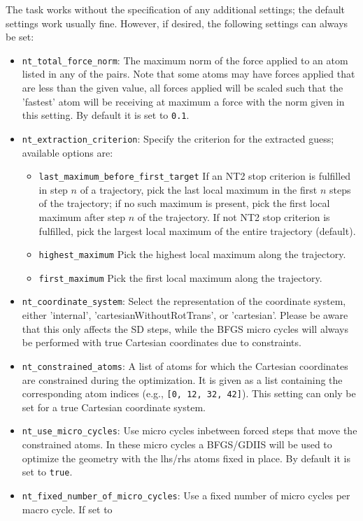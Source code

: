 \documentclass[]{tufte-book}
\begin{document}
The task works without the specification of any additional settings; the default settings work usually fine. However,
if desired, the following settings can always be set:
\begin{itemize}
\item \texttt{nt\_total\_force\_norm}: The maximum norm of the force applied to an atom listed in any of the pairs.
 Note that some atoms may have forces applied that are less than the given value, all forces applied will be scaled
 such that the 'fastest' atom will be receiving at maximum a force with the norm given in this setting.
 By default it is set to \texttt{0.1}.
\item \texttt{nt\_extraction\_criterion}: Specify the criterion for the extracted guess; available options are:
\begin{itemize}
  \item \texttt{last\_maximum\_before\_first\_target} If an NT2 stop criterion is fulfilled in step $n$ of a trajectory, pick the last local maximum in the first $n$ steps of the trajectory; if no such maximum is present, pick the first local maximum after step $n$ of the trajectory. If not NT2 stop criterion is fulfilled, pick the largest local maximum of the entire trajectory (default).
  \item \texttt{highest\_maximum} Pick the highest local maximum along the trajectory.
  \item \texttt{first\_maximum} Pick the first local maximum along the trajectory.
\end{itemize}
\item \texttt{nt\_coordinate\_system}: Select the representation of the coordinate system, either
 'internal'\cite{libirc}, 'cartesianWithoutRotTrans', or 'cartesian'.
Please be aware that this only affects the SD steps, while the BFGS micro cycles will always be performed with true
 Cartesian coordinates due to constraints.
\item \texttt{nt\_constrained\_atoms}: A list of atoms for which the Cartesian coordinates are constrained during the optimization.
  It is given as a list containing the corresponding atom indices (e.g., \texttt{[0, 12, 32, 42]}). This setting can only be set for a true Cartesian coordinate system.
\item \texttt{nt\_use\_micro\_cycles}: Use micro cycles inbetween forced steps that move the constrained atoms.
In these micro cycles a BFGS/GDIIS will be used to optimize the geometry with the lhs/rhs atoms fixed in place.
By default it is set to \texttt{true}.
\item \texttt{nt\_fixed\_number\_of\_micro\_cycles}: Use a fixed number of micro cycles per macro cycle. If set to

\end{itemize}
\end{document}

